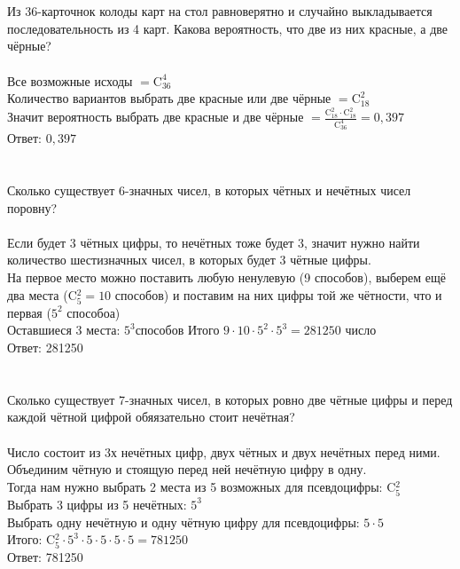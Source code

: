 \documentclass{article}
\begin{document}
\section{}
Из 36-карточнок колоды карт на стол равноверятно и случайно выкладывается последовательность из 4 карт. Какова вероятность, что две из них красные, а две чёрные?\\\\
Все возможные исходы $= \text{C}^4_{36}$\\
Количество вариантов выбрать две красные или две чёрные $=\text{C}^2_{18}$\\
Значит вероятность выбрать две красные и две чёрные $= \frac{\text{C}^2_{18} \cdot \text{C}^2_{18}}{\text{C}^4_{36}} = 0,397$\\
Ответ: $0,397$
\section{}
Сколько существует 6-значных чисел, в которых чётных и нечётных чисел поровну?\\\\
Если будет 3 чётных цифры, то нечётных тоже будет 3, значит нужно найти количество шестизначных чисел, в которых будет 3 чётные цифры.
\\На первое место можно поставить любую ненулевую (9 способов),
выберем ещё два места (C$^2_5=10$ способов) и поставим на них цифры той же чётности, что и первая ($5^2$ способоа)\\
Оставшиеся 3 места: $5^3 способов$
Итого $9\cdot10\cdot5^2\cdot5^3 = 281250$ число
\\Ответ: 281250
\section{}
Сколько существует 7-значных чисел, в которых ровно две чётные цифры и перед каждой чётной цифрой обяязательно стоит нечётная?\\\\
Число состоит из 3х нечётных цифр, двух чётных и двух нечётных перед ними.\\
Объединим чётную и стоящую перед ней нечётную цифру в одну.\\
Тогда нам нужно выбрать 2 места из 5 возможных для псевдоцифры: C$^2_5$\\
Выбрать 3 цифры из 5 нечётных: $5^3$\\
Выбрать одну нечётную и одну чётную цифру для псевдоцифры: $5 \cdot 5$\\
Итого: C$^2_5 \cdot 5^3 \cdot 5 \cdot 5 \cdot 5 \cdot 5 = 781250$\\
Ответ: 781250
\end{document}

